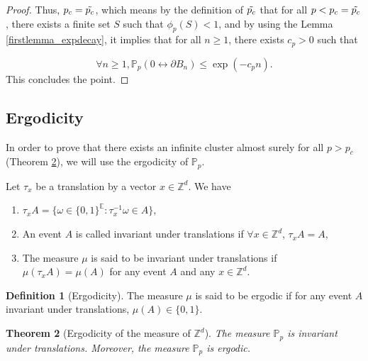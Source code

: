\documentclass[a4paper,11pt]{article}
\theoremstyle{plain}
\newtheorem{theorem}{Theorem}[section]
\theoremstyle{definition}
\newtheorem{definition}[theorem]{Definition}
\theoremstyle{remark}
\begin{document}
\begin{proof}
Thus, $p_c = \Tilde{p_c}$, which means by the definition of $\Tilde{p_c}$ that for all $p < p_c = \Tilde{p_c}$, there exists a finite set $S$ such that $\phi_p(S) < 1$, and by using the Lemma \ref{firstlemma_expdecay}, it implies that for all $n \geq 1$, there exists $c_p > 0$ such that

\[ \forall n \geq 1, \mathbb{P}_p(0 \longleftrightarrow \partial B_n) \leq \exp(-c_p n). \]
This concludes the point.
\end{proof}

\subsection{Ergodicity}

In order to prove that there exists an infinite cluster almost surely for all $p > p_c$ (Theorem \ref{ergodicity_pp}), we will use the ergodicity of $\mathbb{P}_p$.

Let $\tau_x$ be a translation by a vector $x \in \mathbb{Z}^d$. We have
\begin{enumerate}[(1)]
    \item $\tau_x A = \{ \omega \in \{0,1\}^\mathbb{E} : \tau_x^{-1}\omega \in A \}$,
    \item An event $A$ is called invariant under translations if $\forall x \in \mathbb{Z}^d$, $\tau_{x}A=A$,
    \item The measure $\mu$ is said to be invariant under translations if $\mu(\tau_x A) = \mu(A)$  for any event $A$ and any $x \in \mathbb{Z}^d$.
\end{enumerate}
    
\begin{definition}[Ergodicity]
The measure $\mu$ is said to be ergodic if for any event $A$ invariant under translations, $\mu(A) \in \{0,1\}.$
\end{definition}

\begin{theorem}[Ergodicity of the measure of $\mathbb{Z}^d$]
\label{ergodicity_pp}
The measure $\mathbb{P}_p$ is invariant under translations. Moreover, the measure $\mathbb{P}_p$ is ergodic.
\end{theorem}
\end{document}
